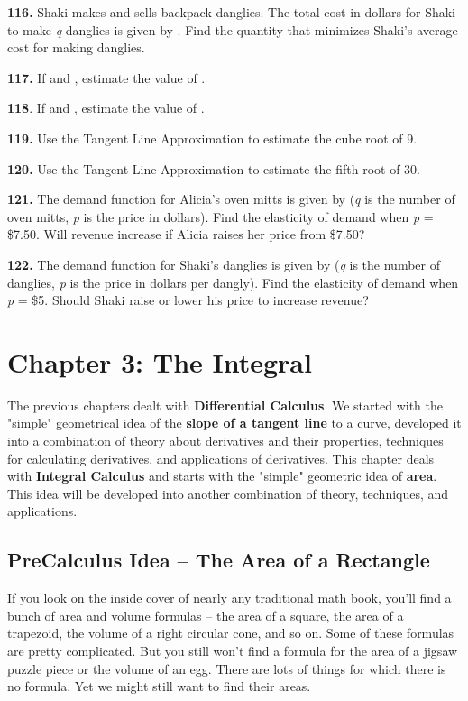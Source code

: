 \textbf{116.} Shaki makes and sells backpack danglies. The total cost in
dollars for Shaki to make \emph{q} danglies is given by . Find the
quantity that minimizes Shaki's average cost for making danglies.

\textbf{117.} If and , estimate the value of .

\textbf{118}. If and , estimate the value of .

\textbf{119.} Use the Tangent Line Approximation to estimate the cube
root of 9.

\textbf{120.} Use the Tangent Line Approximation to estimate the fifth
root of 30.

\textbf{121.} The demand function for Alicia's oven mitts is given by
(\emph{q} is the number of oven mitts, \emph{p} is the price in
dollars). Find the elasticity of demand when \emph{p} = \$7.50. Will
revenue increase if Alicia raises her price from \$7.50?

\textbf{122.} The demand function for Shaki's danglies is given by
(\emph{q} is the number of danglies, \emph{p} is the price in dollars
per dangly). Find the elasticity of demand when \emph{p} = \$5. Should
Shaki raise or lower his price to increase revenue?

\hypertarget{chapter-3-the-integral}{\section{Chapter 3: The
Integral}\label{chapter-3-the-integral}}

The previous chapters dealt with \textbf{Differential Calculus}. We
started with the "simple" geometrical idea of the \textbf{slope of a
tangent line} to a curve, developed it into a combination of theory
about derivatives and their properties, techniques for calculating
derivatives, and applications of derivatives. This chapter deals with
\textbf{Integral Calculus} and starts with the "simple" geometric idea
of \textbf{area}. This idea will be developed into another combination
of theory, techniques, and applications.

\hypertarget{precalculus-idea-the-area-of-a-rectangle}{\subsection{PreCalculus
Idea -- The Area of a
Rectangle}\label{precalculus-idea-the-area-of-a-rectangle}}

If you look on the inside cover of nearly any traditional math book,
you'll find a bunch of area and volume formulas -- the area of a square,
the area of a trapezoid, the volume of a right circular cone, and so on.
Some of these formulas are pretty complicated. But you still won't find
a formula for the area of a jigsaw puzzle piece or the volume of an egg.
There are lots of things for which there is no formula. Yet we might
still want to find their areas.

